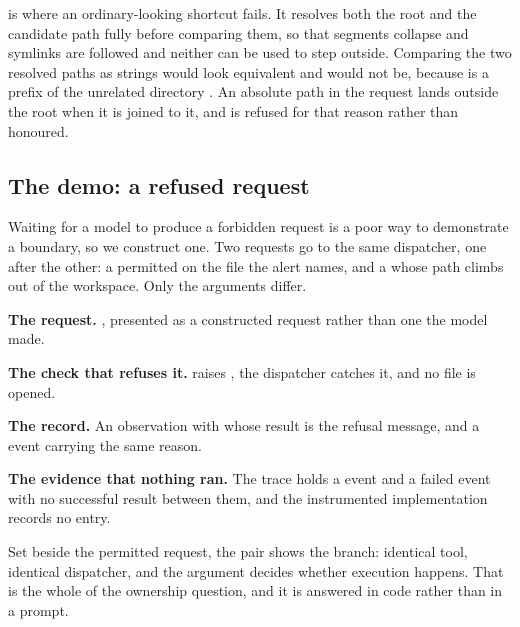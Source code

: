  is where an ordinary-looking shortcut fails. It resolves both the root
and the candidate path fully before comparing them, so that  segments collapse and
symlinks are followed and neither can be used to step outside. Comparing the two resolved paths as strings would look
equivalent and would not be, because  is a prefix of the unrelated directory
. An absolute path in the request lands outside the root when it is joined to
it, and is refused for that reason rather than honoured.

\subsection{The demo: a refused request}
\label{sec:boundary-demo}

Waiting for a model to produce a forbidden request is a poor way to demonstrate a boundary, so we
construct one. Two requests go to the same dispatcher, one after the other: a permitted
 on the file the alert names, and a  whose path climbs out
of the workspace. Only the arguments differ.

\bi

\item \textbf{The request.} , presented as a constructed request rather than one the model made.

\item \textbf{The check that refuses it.}  raises
, the dispatcher catches it, and no file is opened.

\item \textbf{The record.} An observation with  whose result is the refusal
message, and a  event carrying the same reason.

\item \textbf{The evidence that nothing ran.} The trace holds a  event and a
failed  event with no successful result between them, and the instrumented
implementation records no entry.

\ei

Set beside the permitted request, the pair shows the branch: identical tool, identical dispatcher,
and the argument decides whether execution happens. That is the whole of the ownership question, and
it is answered in code rather than in a prompt.

